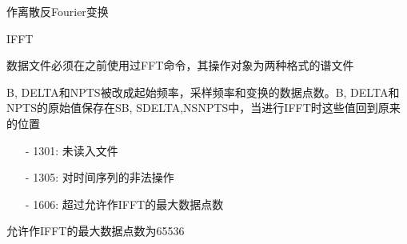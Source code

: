 \label{cmd:ifft}

作离散反Fourier变换

\begin{SACSTX}
IFFT
\end{SACSTX}

数据文件必须在之前使用过FFT命令，其操作对象为两种格式的谱文件

B, DELTA和NPTS被改成起始频率，采样频率和变换的数据点数。B, DELTA和NPTS的原始值保存在SB, SDELTA,NSNPTS中，当进行IFFT时这些值回到原来的位置

\begin{itemize}
\item[-]1301: 未读入文件
\item[-]1305: 对时间序列的非法操作
\item[-]1606: 超过允许作IFFT的最大数据点数
\end{itemize}

允许作IFFT的最大数据点数为65536

